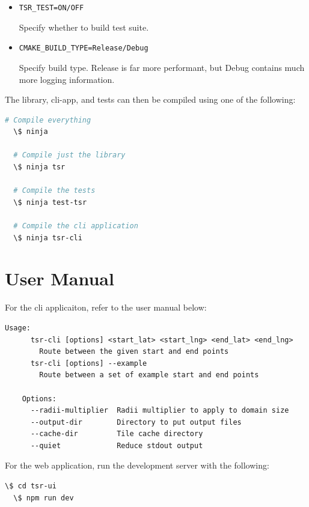 \documentclass[12pt]{article}
\begin{document}
\begin{appendices}
  \begin{itemize}
    \item \texttt{TSR\_TEST=ON/OFF}

          Specify whether to build test suite.

    \item \texttt{CMAKE\_BUILD\_TYPE=Release/Debug}

          Specify build type. Release is far more performant, but Debug contains much more logging information.
  \end{itemize}


  \noindent The library, cli-app, and tests can then be compiled using one of the following:

  \begin{lstlisting}[language=bash]
  # Compile everything
  \$ ninja

  # Compile just the library
  \$ ninja tsr

  # Compile the tests
  \$ ninja test-tsr

  # Compile the cli application
  \$ ninja tsr-cli
\end{lstlisting}

  \pagebreak
  \section{User Manual}

  For the cli applicaiton, refer to the user manual below:

  \begin{lstlisting}[]
  Usage: 
      tsr-cli [options] <start_lat> <start_lng> <end_lat> <end_lng>
        Route between the given start and end points
      tsr-cli [options] --example  
        Route between a set of example start and end points

    Options:
      --radii-multiplier  Radii multiplier to apply to domain size
      --output-dir        Directory to put output files
      --cache-dir         Tile cache directory
      --quiet             Reduce stdout output
\end{lstlisting}

  For the web application, run the development server with the following:

  \begin{lstlisting}[language=bash]
  \$ cd tsr-ui
  \$ npm run dev
\end{lstlisting}

  \pagebreak
  
  

\end{appendices}
\end{document}
